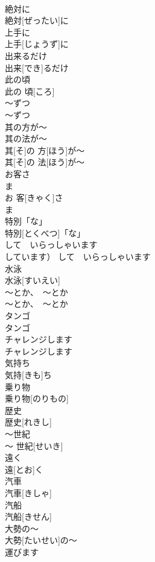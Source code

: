 \documentclass[8pt]{extreport}
\begin{document}
\begin{CJK}{UTF8}{min}
\\	絶対に	
\\	絶対[ぜったい]に	
\\	上手に	
\\	上手[じょうず]に	
\\	出来るだけ	
\\	出来[でき]るだけ	
\\	此の頃	
\\	此の 頃[ころ]	
\\	〜ずつ	
\\	〜ずつ	
\\	其の方が〜
\\	其の法が〜	
\\	其[そ]の 方[ほう]が〜
\\	其[そ]の 法[ほう]が〜	
\\	お客さ
\\	ま	
\\	お 客[きゃく]さ
\\	ま	
\\	特別「な」	
\\	特別[とくべつ]「な」	
\\	して　いらっしゃいます	
\\	しています）	して　いらっしゃいます	
\\	水泳	
\\	水泳[すいえい]	
\\	〜とか、　〜とか	
\\	〜とか、　〜とか	
\\	タンゴ	
\\	タンゴ	
\\	チャレンジします	
\\	チャレンジします	
\\	気持ち	
\\	気持[きも]ち	
\\	乗り物	
\\	乗り物[のりもの]	
\\	歴史	
\\	歴史[れきし]	
\\	〜世紀	
\\	〜 世紀[せいき]	
\\	遠く	
\\	遠[とお]く	
\\	汽車	
\\	汽車[きしゃ]	
\\	汽船	
\\	汽船[きせん]	
\\	大勢の〜	
\\	大勢[たいせい]の〜	
\\	運びます	

\end{CJK}
\end{document}

